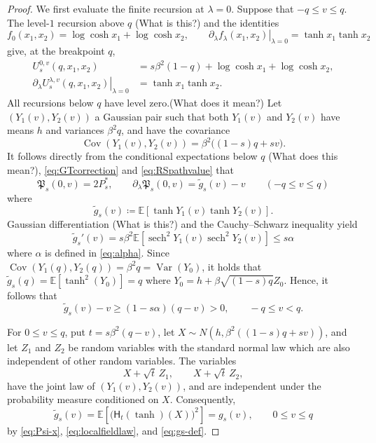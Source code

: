 \documentclass[11pt]{article}
\numberwithin{equation}{section}
\newcommand{\E}{\mathbb{E}}
\newcommand{\1}{\mathbf 1}
\newcommand{\sech}{\operatorname{sech}}
\newcommand{\Cov}{\operatorname{Cov}}
\begin{document}
\begin{proof}

We first evaluate the finite recursion at $\lambda=0$.  Suppose that
$-q\le v\le q$.  The level-$1$ recursion above $q$ {\color{red}(What is this?)} and the identities
\[
 f_0(x_1,x_2)=\log\cosh x_1+\log\cosh x_2,
 \qquad
 \left.\partial_\lambda f_\lambda(x_1,x_2)
 \right|_{\lambda=0}=\tanh x_1\tanh x_2
\]
give, at the breakpoint $q$, 
\begin{align*}
 U_s^{0,v}(q,x_1,x_2)
 &=s\beta^2(1-q)+\log\cosh x_1+\log\cosh x_2,\\
 \left.\partial_\lambda U_s^{\lambda,v}(q,x_1,x_2)
 \right|_{\lambda=0}
 &=\tanh x_1\tanh x_2.
\end{align*}
All recursions below $q$ have level zero.{\color{red}(What does it mean?)}
Let $(Y_1(v),Y_2(v))$  a Gaussian
pair such that both $Y_1(v)$ and $Y_2(v)$ have means $h$ and variances $\beta^2q$, and have the covariance
\[
 \Cov(Y_1(v),Y_2(v))
 =\beta^2\bigl((1-s)q+sv\bigr).
\]
It follows directly from the conditional expectations below $q$ {\color{red}(What does this mean?)}, \eqref{eq:GTcorrection} and
\eqref{eq:RSpathvalue} that
\begin{equation}
 \mathfrak P_s(0,v)=2P_s^*,
 \qquad
 \partial_\lambda\mathfrak P_s(0,v)= \tilde{g}_s(v)-v \qquad (-q\le v\le q)
 \label{eq:GT-zero-signed-simple}
\end{equation}
where
\[
 \tilde{g}_s(v)
 \coloneqq
 \E[\tanh Y_1(v)\tanh Y_2(v)].
\]
Gaussian differentiation {\color{red}(What is this?)} and the Cauchy--Schwarz inequality yield
\[
 \tilde{g}_s'(v)
 =s\beta^2
  \E[\sech^2Y_1(v)\sech^2Y_2(v)]
 \le s\alpha
\]
where $\alpha$ is defined in \eqref{eq:alpha}.
Since $\Cov(Y_1(q),Y_2(q)) = \beta ^2 q = \operatorname{Var} (Y_0)$, it holds that $\tilde{g}_s (q) = \E[\tanh ^2 (Y_0)] =q$ where $Y_0 = h + \beta \sqrt{(1-s)q}Z_0$.
Hence, it follows that
\begin{equation}
\tilde{g}_s(v) -v
 \ge(1-s\alpha)(q-v)>0,
 \qquad -q\le v<q.
 \label{eq:GT-signed-positive-simple}
\end{equation}

For $0\le v\le q$, put $t=s\beta^2(q-v)$, let
$X\sim N(h,\beta^2((1-s)q+sv))$, and let $Z_1$ and $Z_2$ be random variables with the standard normal law which are also independent of other random variables.  
The variables
\[
 X+\sqrt t\,Z_1,
 \qquad X+\sqrt t\,Z_2,
\]
have the joint law of $(Y_1(v),Y_2(v))$, and are independent under the probability measure conditioned on $X$.
Consequently,
\begin{equation}\label{eq:gv(0<v<q)}
 \tilde{g}_s(v) =\E\left[
 \bigl(\mathsf H_t(\tanh)(X)\bigr)^2
 \right]=g_s(v), \qquad 0\le v \le q
\end{equation}
by \eqref{eq:Psi-x}, \eqref{eq:localfieldlaw}, and \eqref{eq:gs-def}.


\end{proof}
\end{document}
